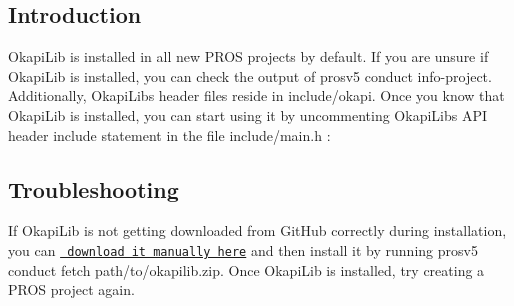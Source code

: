 \subsection*{Introduction}

Okapi\+Lib is installed in all new P\+R\+OS projects by default. If you are unsure if Okapi\+Lib is installed, you can check the output of {\ttfamily prosv5 conduct info-\/project}. Additionally, Okapi\+Lib\textquotesingle{}s header files reside in {\ttfamily include/okapi}. Once you know that Okapi\+Lib is installed, you can start using it by uncommenting Okapi\+Lib\textquotesingle{}s A\+PI header include statement in the file {\ttfamily include/main.\+h} \+:


\begin{DoxyCode}{0}
\DoxyCodeLine{}
\DoxyCodeLine{/**}
\DoxyCodeLine{ */}
\end{DoxyCode}


\subsection*{Troubleshooting}

If Okapi\+Lib is not getting downloaded from Git\+Hub correctly during installation, you can \href{https://github.com/OkapiLib/OkapiLib/releases}{\texttt{ download it manually here}} and then install it by running {\ttfamily prosv5 conduct fetch path/to/okapilib.\+zip}. Once Okapi\+Lib is installed, try creating a P\+R\+OS project again. 